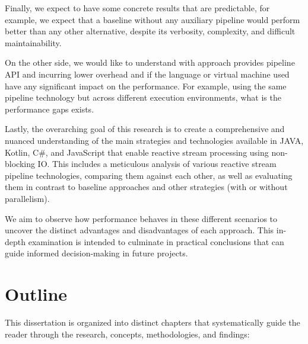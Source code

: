 Finally, we expect to have some concrete results that are predictable, for example, we expect that a baseline without any auxiliary pipeline would perform better than any other alternative, despite its verbosity, complexity, and difficult maintainability.

On the other side, we would like to understand with approach provides pipeline API and incurring lower overhead and if the language or virtual machine used have any significant impact on the performance. For example, using the same pipeline technology but across different execution environments, what is the performance gaps exists. 

Lastly, the overarching goal of this research is to create a comprehensive and nuanced understanding of the main strategies and technologies available in JAVA, Kotlin, C\#, and JavaScript that enable reactive stream processing using non-blocking IO. This includes a meticulous analysis of various reactive stream pipeline technologies, comparing them against each other, as well as evaluating them in contrast to baseline approaches and other strategies (with or without parallelism). 

We aim to observe how performance behaves in these different scenarios to uncover the distinct advantages and disadvantages of each approach. This in-depth examination is intended to culminate in practical conclusions that can guide informed decision-making in future projects.

\section{Outline}
\label{sec:outline}

This dissertation is organized into distinct chapters that systematically guide the reader through the research, concepts, methodologies, and findings:

